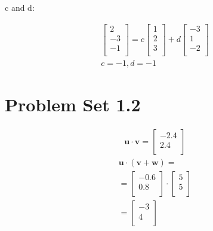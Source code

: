 \documentclass{report}
\begin{document}
c and d:

\begin{gather*}
    \begin{bmatrix}
        2\\
        -3\\
        -1\\
    \end{bmatrix} =
    c
    \begin{bmatrix}
        1\\
        2\\
        3\\
    \end{bmatrix} +
    d
    \begin{bmatrix}
        -3\\
        1\\
        -2\\
    \end{bmatrix} \\
    c = -1, d = -1
\end{gather*}

\newpage

\chapter{Problem Set 1.2}

\begin{question}{1}{}
    \begin{gather*}
        \mathbf{u} \cdot \mathbf{v} =
        \begin{bmatrix}
            -2.4\\
            2.4\\
        \end{bmatrix}
    \end{gather*}
    \begin{gather*}
        \mathbf{u} \cdot ( \mathbf{v} + \mathbf{w} ) = \\
        =
        \begin{bmatrix}
            -0.6\\
            0.8\\
        \end{bmatrix} \cdot
        \begin{bmatrix}
            5\\
            5\\
        \end{bmatrix} \\
        =
        \begin{bmatrix}
            -3\\
            4\\
        \end{bmatrix}
    \end{gather*}
\end{question}
\end{document}
